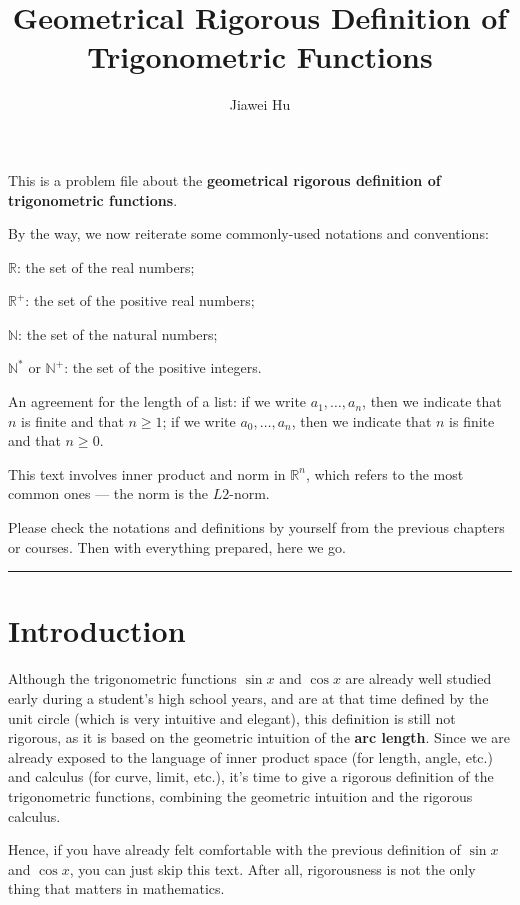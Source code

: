 \documentclass{article}
\title{\LARGE \textbf{Geometrical Rigorous Definition of Trigonometric Functions}}
\author{\large Jiawei Hu}
\begin{document}
\maketitle
\tableofcontents
\newpage

This is a problem file about the \textbf{geometrical rigorous definition of trigonometric functions}.  

By the way, we now reiterate some commonly-used notations and conventions:
\begin{compactenum}
    \item $\mathbb{R}$: the set of the real numbers;
    \item $\mathbb{R}^+$: the set of the positive real numbers;
    \item $\mathbb{N}$: the set of the natural numbers;
    \item $\mathbb{N^\ast}$ or $\mathbb{N}^+$: the set of the positive integers.
    \item An agreement for the length of a list: if we write $a_1, \dots, a_n$, then we indicate that $n$ is finite and that $n\geq 1$; if we write $a_0, \dots, a_n$, then we indicate that $n$ is finite and that $n\geq 0$.
    \item This text involves inner product and norm in $\mathbb{R}^n$, which refers to the most common ones — the norm is the $L2$-norm.
\end{compactenum} 
Please check the notations and definitions by yourself from the previous chapters or courses. Then with everything prepared, here we go.

\noindent\rule{\textwidth}{2pt}

\section{Introduction}
Although the trigonometric functions $\sin x$ and $\cos x$ are already well studied early during a student's high school years, and are at that time defined by the unit circle (which is very intuitive and elegant), this definition is still not rigorous, as it is based on the geometric intuition of the \textbf{arc length}. Since we are already exposed to the language of inner product space (for length, angle, etc.) and calculus (for curve, limit, etc.), it's time to give a rigorous definition of the trigonometric functions, combining the geometric intuition and the rigorous calculus.

Hence, if you have already felt comfortable with the previous definition of $\sin x$ and $\cos x$, you can just skip this text. After all, rigorousness is not the only thing that matters in mathematics. 
\end{document}

